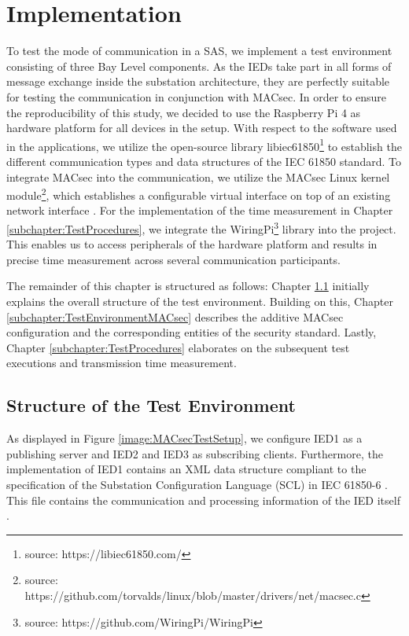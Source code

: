 \documentclass[conference, onecolumn, a4paper]{IEEEtran}
\begin{document}
\section{Implementation}
\label{chapter:implementation}
\noindent To test the mode of communication in a SAS, we implement a test environment consisting of three Bay Level components. As the IEDs take part 
in all forms of message exchange inside the substation architecture, they are perfectly suitable for testing the communication in conjunction with MACsec. 
In order to ensure the reproducibility of this study, we decided to use the Raspberry Pi 4 as hardware platform for all devices in the setup. With respect 
to the software used in the applications, we utilize the open-source library libiec61850\footnote{source: https://libiec61850.com/} to establish the 
different communication types and data structures of the IEC 61850 standard. To integrate MACsec into the communication, we utilize the MACsec Linux kernel 
module\footnote{source: https://github.com/torvalds/linux/blob/master/drivers/net/macsec.c}, which establishes a configurable virtual interface on top of 
an existing network interface \cite{MACsecLinuxModuleDoc:2016}. For the implementation of the time measurement in Chapter \ref{subchapter:TestProcedures},  
we integrate the WiringPi\footnote{source: https://github.com/WiringPi/WiringPi} library into the project. This enables us to access peripherals of the 
hardware platform and results in precise time measurement across several communication participants. 

\smallskip 
The remainder of this chapter is structured as follows: Chapter \ref{subchapter:TestEnvironmentStructure} initially explains the overall structure of the 
test environment. Building on this, Chapter \ref{subchapter:TestEnvironmentMACsec} describes the additive MACsec configuration and the corresponding entities 
of the security standard. Lastly, Chapter \ref{subchapter:TestProcedures} elaborates on the subsequent test executions and transmission time measurement. 

\subsection{Structure of the Test Environment}
\label{subchapter:TestEnvironmentStructure}
\noindent As displayed in Figure \ref{image:MACsecTestSetup}, we configure IED1 as a publishing server and IED2 and IED3 as subscribing clients. 
Furthermore, the implementation of IED1 contains an XML data structure compliant to the specification of the Substation Configuration Language (SCL) 
in IEC 61850-6 \cite{IEC61850-6:2010}. This file contains the communication and processing information of the IED itself \cite{IEC61850_Overview:2006}.
\end{document}
